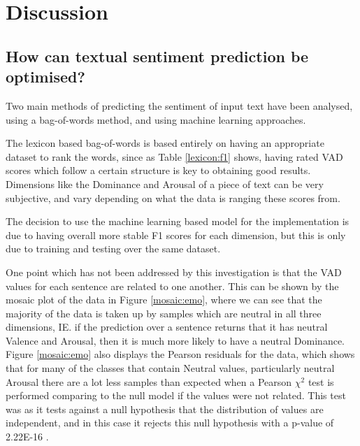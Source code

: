 \section{Discussion} 

\subsection{How can textual sentiment prediction be optimised?}

Two main methods of predicting the sentiment of input text have been analysed, using a bag-of-words method, and using machine learning approaches.

The lexicon based bag-of-words is based entirely on having an appropriate dataset to rank the words, since as Table \ref{lexicon:f1} shows, having rated VAD scores which follow a certain structure is key to obtaining good results. Dimensions like the Dominance and Arousal of a piece of text can be very subjective, and vary depending on what the data is ranging these scores from. 

The decision to use the machine learning based model for the implementation is due to having overall more stable F1 scores for each dimension, but this is only due to training and testing over the same dataset. 

One point which has not been addressed by this investigation is that the VAD values for each sentence are related to one another. This can be shown by the mosaic plot of the data in Figure \ref{mosaic:emo}, where we can see that the majority of the data is taken up by samples which are neutral in all three dimensions, IE.  if the prediction over a sentence returns that it has neutral Valence and Arousal, then it is much more likely to have a neutral Dominance. Figure \ref{mosaic:emo} also displays the Pearson residuals for the data, which shows that for many of the classes that contain Neutral values, particularly neutral Arousal there are a lot less samples than expected when a Pearson $\chi^2$ test is performed comparing to the null model if the values were not related. This test was as it tests against a null hypothesis that the distribution of values are independent, and in this case it rejects this null hypothesis with a p-value of 2.22E-16 \cite{zeileis2007residual}.

